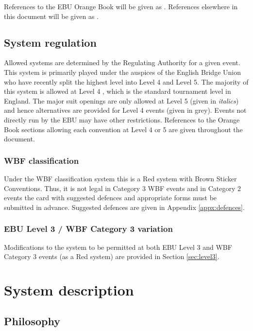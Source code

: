 \documentclass[a4paper,14pt]{extarticle}
\begin{document}
References to the EBU Orange Book will be given as . References
elsewhere in this document will be given as .

\subsection{System regulation}

Allowed systems are determined by the Regulating Authority for a given event.
This system is primarily played under the auspices of the English Bridge Union
who have recently split the highest level into Level 4 and Level 5. The
majority of this system is allowed at Level 4 , which is the
standard tournament level in England. The major suit openings are only allowed
at Level 5  (given in {\it italics}) and hence alternatives are
provided for Level 4 events (given in {\color{CadetBlue}grey}).  Events not
directly run by the EBU may have other restrictions.  References to the Orange
Book sections allowing each convention at Level 4 or 5 are given throughout the
document.

\subsubsection{WBF classification}

Under the WBF classification system this is a Red system with Brown Sticker
Conventions. Thus, it is not legal in Category 3 WBF events and in Category 2
events the card with suggested defences and appropriate forms must be submitted
in advance. Suggested defences are given in Appendix \ref{appx:defences}.

\subsubsection{EBU Level 3 / WBF Category 3 variation}

Modifications to the system to be permitted at both EBU Level 3 and WBF
Category 3 events (as a Red system) are provided in Section \ref{sec:level3}.

\newpage

\section{System description}
\label{sec:system}

\subsection{Philosophy}
\label{sec:philosophy}
\end{document}

